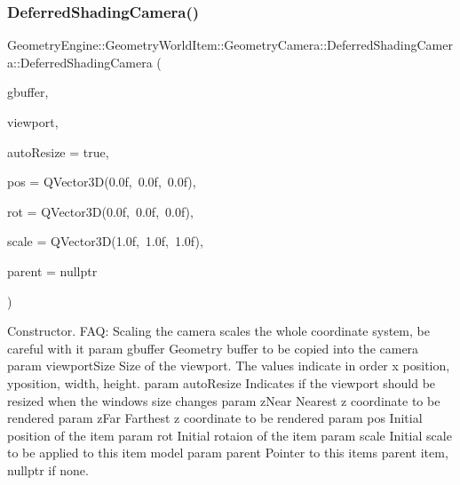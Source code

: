 \subsubsection{\texorpdfstring{DeferredShadingCamera()}{DeferredShadingCamera()}\hspace{0.1cm}{\footnotesize\ttfamily [1/2]}}
{\footnotesize\ttfamily Geometry\+Engine\+::\+Geometry\+World\+Item\+::\+Geometry\+Camera\+::\+Deferred\+Shading\+Camera\+::\+Deferred\+Shading\+Camera (\begin{DoxyParamCaption}\item[{const \mbox{\hyperlink{class_geometry_engine_1_1_geometry_buffer_1_1_g_buffer}{Geometry\+Buffer\+::\+G\+Buffer}} \&}]{gbuffer,  }\item[{const \mbox{\hyperlink{class_geometry_engine_1_1_geometry_item_utils_1_1_viewport}{Geometry\+Item\+Utils\+::\+Viewport}} \&}]{viewport,  }\item[{bool}]{auto\+Resize = {\ttfamily true},  }\item[{const Q\+Vector3D \&}]{pos = {\ttfamily QVector3D(0.0f,~0.0f,~0.0f)},  }\item[{const Q\+Vector3D \&}]{rot = {\ttfamily QVector3D(0.0f,~0.0f,~0.0f)},  }\item[{const Q\+Vector3D \&}]{scale = {\ttfamily QVector3D(1.0f,~1.0f,~1.0f)},  }\item[{\mbox{\hyperlink{class_geometry_engine_1_1_geometry_world_item_1_1_world_item}{World\+Item}} $\ast$}]{parent = {\ttfamily nullptr} }\end{DoxyParamCaption})}

Constructor. F\+AQ\+: Scaling the camera scales the whole coordinate system, be careful with it param gbuffer Geometry buffer to be copied into the camera param viewport\+Size Size of the viewport. The values indicate in order x position, yposition, width, height. param auto\+Resize Indicates if the viewport should be resized when the window\textquotesingle{}s size changes param z\+Near Nearest z coordinate to be rendered param z\+Far Farthest z coordinate to be rendered param pos Initial position of the item param rot Initial rotaion of the item param scale Initial scale to be applied to this item model param parent Pointer to this items parent item, nullptr if none. \mbox{\label{class_geometry_engine_1_1_geometry_world_item_1_1_geometry_camera_1_1_deferred_shading_camera_a3fddaea07dd897fe83081ff45cf99416}} 
